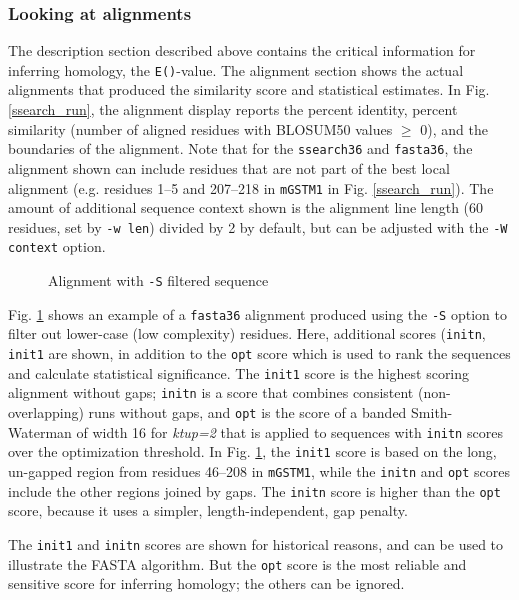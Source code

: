 \documentclass[11pt]{article}
\begin{document}
\subsubsection{Looking at alignments}

The description section described above contains the critical
information for inferring homology, the \texttt{E()}-value.  The
alignment section shows the actual alignments that produced the
similarity score and statistical estimates.  In
Fig. \ref{ssearch_run}, the alignment display reports the percent
identity, percent similarity (number of aligned residues with BLOSUM50
values $\ge$ 0), and the boundaries of the alignment.  Note that for
the \texttt{ssearch36} and \texttt{fasta36}, the alignment shown can
include residues that are not part of the best local alignment
(e.g. residues 1--5 and 207--218 in \texttt{mGSTM1} in
Fig. \ref{ssearch_run}).  The amount of additional sequence context
shown is the alignment line length (60 residues, set by \texttt{-w
  len}) divided by 2 by default, but can be adjusted with the
\texttt{-W context} option.

\begin{figure}

\vspace{-3.0ex}
\caption{\label{seg-aln}Alignment with \texttt{-S} filtered sequence}
\end{figure}

Fig. \ref{seg-aln} shows an example of a \texttt{fasta36} alignment
produced using the \texttt{-S} option to filter out lower-case (low
complexity) residues.  Here, additional scores (\texttt{initn},
\texttt{init1} are shown, in addition to the \texttt{opt} score which
is used to rank the sequences and calculate statistical significance.
The \texttt{init1} score is the highest scoring alignment without
gaps; \texttt{initn} is a score that combines consistent
(non-overlapping) runs without gaps, and \texttt{opt} is the score of
a banded Smith-Waterman of width 16 for \emph{ktup=2} that is applied
to sequences with \texttt{initn} scores over the optimization
threshold. In Fig. \ref{seg-aln},  the \texttt{init1} score is
based on the long, un-gapped region from residues 46--208 in
\texttt{mGSTM1}, while the \texttt{initn} and \texttt{opt} scores
include the other regions joined by gaps.  The \texttt{initn} score is
higher than the \texttt{opt} score, because it uses a simpler,
length-independent, gap penalty.

The \texttt{init1} and \texttt{initn} scores are shown for
historical reasons, and can be used to illustrate the FASTA algorithm.
But the \texttt{opt} score is the most reliable and sensitive score
for inferring homology; the others can be ignored.
\end{document}
